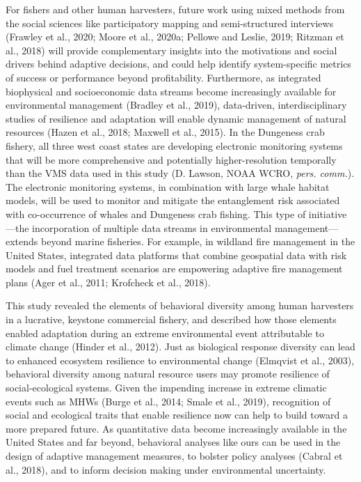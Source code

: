 \documentclass[]{elsarticle} %
\begin{document}
For fishers and other human harvesters, future work using mixed methods
from the social sciences like participatory mapping and semi-structured
interviews (Frawley et al., 2020; Moore et al., 2020a; Pellowe and
Leslie, 2019; Ritzman et al., 2018) will provide complementary insights
into the motivations and social drivers behind adaptive decisions, and
could help identify system-specific metrics of success or performance
beyond profitability. Furthermore, as integrated biophysical and
socioeconomic data streams become increasingly available for
environmental management (Bradley et al., 2019), data-driven,
interdisciplinary studies of resilience and adaptation will enable
dynamic management of natural resources (Hazen et al., 2018; Maxwell et
al., 2015). In the Dungeness crab fishery, all three west coast states
are developing electronic monitoring systems that will be more
comprehensive and potentially higher-resolution temporally than the VMS
data used in this study (D. Lawson, NOAA WCRO, \emph{pers. comm.}). The
electronic monitoring systems, in combination with large whale habitat
models, will be used to monitor and mitigate the entanglement risk
associated with co-occurrence of whales and Dungeness crab fishing. This
type of initiative---the incorporation of multiple data streams in
environmental management---extends beyond marine fisheries. For example,
in wildland fire management in the United States, integrated data
platforms that combine geospatial data with risk models and fuel
treatment scenarios are empowering adaptive fire management plans (Ager
et al., 2011; Krofcheck et al., 2018).

This study revealed the elements of behavioral diversity among human
harvesters in a lucrative, keystone commercial fishery, and described
how those elements enabled adaptation during an extreme environmental
event attributable to climate change (Hinder et al., 2012). Just as
biological response diversity can lead to enhanced ecosystem resilience
to environmental change (Elmqvist et al., 2003), behavioral diversity
among natural resource users may promote resilience of social-ecological
systems. Given the impending increase in extreme climatic events such as
MHWs (Burge et al., 2014; Smale et al., 2019), recognition of social and
ecological traits that enable resilience now can help to build toward a
more prepared future. As quantitative data become increasingly available
in the United States and far beyond, behavioral analyses like ours can
be used in the design of adaptive management measures, to bolster policy
analyses (Cabral et al., 2018), and to inform decision making under
environmental uncertainty.
\end{document}
